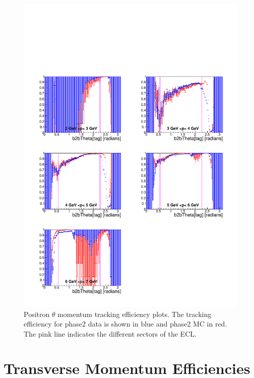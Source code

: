 \documentclass[a4paper,11pt,twosided,final,german,openbib,pdftex,listof=totoc,bibliography=totoc]{scrbook}
\begin{document}
\begin{figure}[!htbp]
	\centering
	\includegraphics[width=\textwidth]{Plots/master/xPMThetaep}
	\caption[Momentum $\theta$ Positron Efficiency Phase2]{Positron $\theta$ momentum tracking efficiency plots. The tracking efficiency for phase2 data is shown in blue and phase2 MC in red. The pink line indicates the different sectors of the ECL.}
	\label{plt:xPMThetaep}
\end{figure}



\clearpage






\section{Transverse Momentum Efficiencies}
\end{document}
